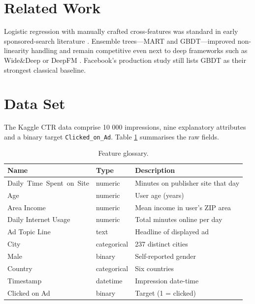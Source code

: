 \documentclass[12pt,a4paper]{article}
\begin{document}
\section{Related Work}\label{sec:related}

Logistic regression with manually crafted cross-features was standard in
early sponsored-search literature \cite{Richardson2007}.  Ensemble
trees—MART \cite{Li2010} and GBDT—improved non-linearity handling and
remain competitive even next to deep frameworks such as
Wide\&Deep \cite{Cheng2016} or DeepFM \cite{Guo2017}.  Facebook’s
production study \cite{He2014} still lists GBDT as their strongest
classical baseline.

\section{Data Set}\label{sec:data}

The Kaggle CTR data comprise 10 000 impressions, nine explanatory
attributes and a binary target \texttt{Clicked\_on\_Ad}.  
Table \ref{tab:features} summarises the raw fields.

\begin{table}[H]
  \centering
  \caption{Feature glossary.}\label{tab:features}
  \begin{tabular}{@{}lll@{}}
    \toprule
    Name  & Type & Description \\
    \midrule
    Daily~Time~Spent~on~Site & numeric & Minutes on publisher site that day \\
    Age                      & numeric & User age (years) \\
    Area Income              & numeric & Mean income in user’s ZIP area \\
    Daily Internet Usage     & numeric & Total minutes online per day \\
    Ad Topic Line            & text    & Headline of displayed ad \\
    City                     & categorical & 237 distinct cities \\
    Male                     & binary  & Self-reported gender \\
    Country                  & categorical & Six countries \\
    Timestamp                & datetime & Impression date-time \\
    Clicked on Ad           & binary  & Target (1 = clicked) \\
    \bottomrule
  \end{tabular}
\end{table}
\end{document}
